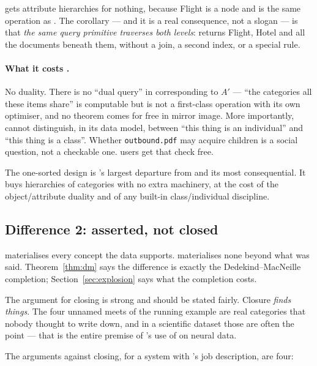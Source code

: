 \odag{} gets attribute hierarchies for nothing, because \textsf{Flight} is a
node and  is the same operation as
. The corollary --- and it is a real consequence,
not a slogan --- is that \emph{the same query primitive traverses both
levels}:  returns \textsf{Flight}, \textsf{Hotel} and all the
documents beneath them, without a join, a second index, or a special rule.

\paragraph{What it costs \odag{}.} No duality. There is no ``dual query'' in
\odag{} corresponding to $A'$ --- ``the categories all these items share'' is
computable but is not a first-class operation with its own optimiser, and no
theorem comes for free in mirror image. More importantly, \odag{} cannot
distinguish, in its data model, between ``this thing is an individual'' and
``this thing is a class''. Whether \texttt{outbound.pdf} may acquire children
is a social question, not a checkable one. \fca{} users get that check free.

\begin{keyidea}
The one-sorted design is \odag{}'s largest departure from \fca{} and its most
consequential. It buys hierarchies of categories with no extra machinery, at
the cost of the object/attribute duality and of any built-in class/individual
discipline.
\end{keyidea}

\subsection{Difference 2: asserted, not closed}
\label{sec:not-closed}

\fca{} materialises every concept the data supports. \odag{} materialises
none beyond what was said. Theorem~\ref{thm:dm} says the difference is exactly
the Dedekind--MacNeille completion; Section~\ref{sec:explosion} says what the
completion costs.

The argument for closing is strong and should be stated fairly. Closure
\emph{finds things}. The four unnamed meets of the running example are real
categories that nobody thought to write down, and in a scientific dataset
those are often the point --- that is the entire premise of
\citet{endres2008}'s use of \fca{} on neural data.

The arguments against closing, for a system with \odag{}'s job description,
are four:

